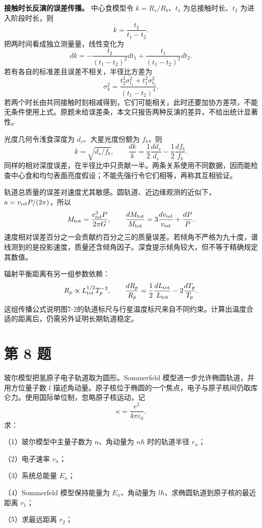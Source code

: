 \documentclass[12pt,a4paper,UTF8]{ctexart}
\begin{document}
\textbf{接触时长反演的误差传播。} 中心食模型令 \(k=R_s/R_b\)、\(t_1\)
为总接触时长、\(t_2\) 为进入阶段时长，则 \[
k=\frac{t_2}{t_1-t_2}.
\] 把两时间看成独立测量量，线性变化为 \[
dk=-\frac{t_2}{(t_1-t_2)^2}dt_1+
\frac{t_1}{(t_1-t_2)^2}dt_2.
\] 若有各自的标准差且误差不相关，半径比方差为 \[
\sigma_k^2=\frac{t_2^2\sigma_{t_1}^2+t_1^2\sigma_{t_2}^2}
{(t_1-t_2)^4}.
\]
若两个时长由共同接触时刻相减得到，它们可能相关，此时还要加协方差项，不能无条件使用上式。原题未给误差条，本文只报告两种反演的差异，不给出统计显著性。

光度几何令浅食深度为 \(d_s\)、大星光度份额为 \(f_b\)，则 \[
k=\sqrt{d_s/f_b},\qquad
\frac{dk}{k}=\frac12\frac{dd_s}{d_s}-\frac12\frac{df_b}{f_b}.
\]
同样的相对深度误差，在半径比中只贡献一半。两条关系使用不同数据，因而能检查中心食和均匀表面亮度假设；不能先强行令它们相等，再称其互相验证。

轨道总质量的误差对速度尤其敏感。圆轨道、近边缘观测的近似下，\(a=v_{\rm rel}P/(2\pi)\)，所以
\[
M_{\rm tot}=\frac{v_{\rm rel}^3P}{2\pi G},\qquad
\frac{dM_{\rm tot}}{M_{\rm tot}}=3\frac{dv_{\rm rel}}{v_{\rm rel}}+\frac{dP}{P}.
\]
速度相对误差百分之一会贡献约百分之三的质量误差。若倾角不严格为九十度，谱线测到的是投影速度，质量还含倾角因子。深食提示倾角较大，但不等于精确规定其数值。

辐射平衡距离有另一组参数依赖： \[
R_p\propto L_{\rm tot}^{1/2}T_p^{-2},\qquad
\frac{dR_p}{R_p}=\frac12\frac{dL_{\rm tot}}{L_{\rm tot}}-2\frac{dT_p}{T_p}.
\]
这组传播公式说明图7-2的轨道标尺与行星温度标尺来自不同约束。计算出温度合适的距离后，仍需另外证明长期轨道稳定。

\newpage

\section{第 8 题}\label{ux7b2c-8-ux9898}

玻尔模型把氢原子电子轨道取为圆形。Sommerfeld
模型进一步允许椭圆轨道，并用方位量子数 \(l\)
描述角动量。原子核位于椭圆的一个焦点，电子与原子核间仍取库仑力。使用国际单位制，忽略原子核运动，记
\[
\kappa=\frac{e^2}{4\pi\varepsilon_0}.
\] 求：

（1）玻尔模型中主量子数为 \(n\)、角动量为 \(n\hbar\) 时的轨道半径
\(r_n\)；

（2）电子速率 \(v_n\)；

（3）系统总能量 \(E_n\)；

（4）Sommerfeld 模型保持能量为 \(E_n\)、角动量为
\(l\hbar\)，求椭圆轨道到原子核的最近距离 \(r_1\)；

（5）求最远距离 \(r_2\)；
\end{document}
